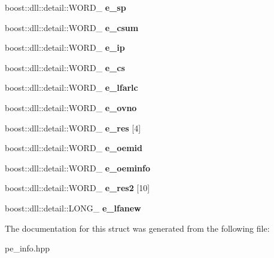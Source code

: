 \begin{DoxyCompactItemize}
\mbox{\label{a01584_ab61386ff8426375970baf5ef2f8cf539}} 
boost\+::dll\+::detail\+::\+W\+O\+R\+D\+\_\+ {\bfseries e\+\_\+sp}
\item 
\mbox{\label{a01584_ad16743e4f83acec334693c2547afb105}} 
boost\+::dll\+::detail\+::\+W\+O\+R\+D\+\_\+ {\bfseries e\+\_\+csum}
\item 
\mbox{\label{a01584_a8028ae070559f87ec740a03279131eea}} 
boost\+::dll\+::detail\+::\+W\+O\+R\+D\+\_\+ {\bfseries e\+\_\+ip}
\item 
\mbox{\label{a01584_a919b4a64651b09fedf5e797df7c6f220}} 
boost\+::dll\+::detail\+::\+W\+O\+R\+D\+\_\+ {\bfseries e\+\_\+cs}
\item 
\mbox{\label{a01584_a9b6f598c4f22bba305e99addb64c2f43}} 
boost\+::dll\+::detail\+::\+W\+O\+R\+D\+\_\+ {\bfseries e\+\_\+lfarlc}
\item 
\mbox{\label{a01584_a9aa2f2cf607b90105a03dda7df67f266}} 
boost\+::dll\+::detail\+::\+W\+O\+R\+D\+\_\+ {\bfseries e\+\_\+ovno}
\item 
\mbox{\label{a01584_af02a10b7d9dfc56843ebaad25d2e6f2f}} 
boost\+::dll\+::detail\+::\+W\+O\+R\+D\+\_\+ {\bfseries e\+\_\+res} \mbox{[}4\mbox{]}
\item 
\mbox{\label{a01584_a5ec6795227f0983da4b2002074731ac6}} 
boost\+::dll\+::detail\+::\+W\+O\+R\+D\+\_\+ {\bfseries e\+\_\+oemid}
\item 
\mbox{\label{a01584_ae0c3c8fa83ec56e89847021b5221971e}} 
boost\+::dll\+::detail\+::\+W\+O\+R\+D\+\_\+ {\bfseries e\+\_\+oeminfo}
\item 
\mbox{\label{a01584_a871a5f507eb49fe4977e8759ccc45763}} 
boost\+::dll\+::detail\+::\+W\+O\+R\+D\+\_\+ {\bfseries e\+\_\+res2} \mbox{[}10\mbox{]}
\item 
\mbox{\label{a01584_a3612d334575e4d09f3f4a11a9ff52e82}} 
boost\+::dll\+::detail\+::\+L\+O\+N\+G\+\_\+ {\bfseries e\+\_\+lfanew}
\end{DoxyCompactItemize}


The documentation for this struct was generated from the following file\+:\begin{DoxyCompactItemize}
\item 
pe\+\_\+info.\+hpp\end{DoxyCompactItemize}
